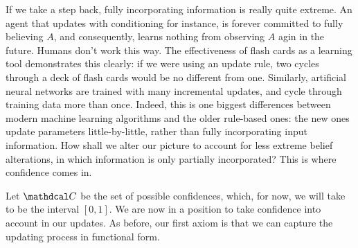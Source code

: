 \documentclass{article}
\def\cofunc{commitment function}
\def\confdom{\mathdcal C}
\begin{document}
If we take a step back, fully incorporating information is really quite extreme. 
An agent that updates with conditioning for instance, is forever committed to fully believing $A$, and consequently, learns nothing from observing $A$ agin in the future. 
Humans don't work this way. 
The effectiveness of flash cards as a learning tool demonstrates this clearly:
if we were using an update rule, two cycles through a deck of flash cards would be no different from one.
Similarly, artificial neural networks are trained with many incremental updates, and cycle through training data more than once.
Indeed, this is one biggest differences between modern machine learning algorithms and the older rule-based ones: the new ones update parameters little-by-little, rather than fully incorporating input information.
How shall we alter our picture to account for less extreme belief alterations, in which information is only partially incorporated?
This is where confidence comes in. 





Let $\confdom$ be the set of possible confidences, which, for now, we will take to be the interval $[0, 1]$. 
We are now in a position to take confidence into account in our updates. 
As before, our first axiom is that we can capture the updating process in functional form. 

\end{document}
